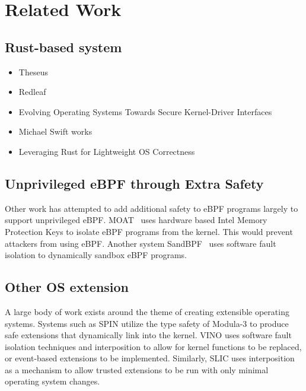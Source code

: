 \section{Related Work}
\subsection{Rust-based system}
\begin{itemize}
    \item Theseus
    \item Redleaf
    \item Evolving Operating Systems Towards Secure Kernel-Driver Interfaces
    \item Michael Swift works
    \item Leveraging Rust for Lightweight OS Correctness
\end{itemize}

\subsection{Unprivileged eBPF through Extra Safety}
Other work has attempted to add additional safety to eBPF programs largely
    to support unprivileged eBPF.
MOAT~\cite{lu2023moat} uses hardware based Intel Memory Protection Keys
    to isolate eBPF programs from the kernel.
This would prevent attackers from using eBPF.
Another system SandBPF~\cite{sandbpf} uses software fault isolation to dynamically
    sandbox eBPF programs.

\subsection{Other OS extension}
A large body of work exists around the theme of creating extensible operating systems.
Systems such as SPIN \cite{spin} utilize the type safety of Modula-3 to produce safe extensions that dynamically link into the kernel.
VINO \cite{vino} uses software fault isolation techniques and interposition to allow for kernel functions to be replaced, or event-based extensions to be implemented.
Similarly, SLIC \cite{slic} uses interposition as a mechanism to allow trusted extensions to be run with only minimal operating system changes.
